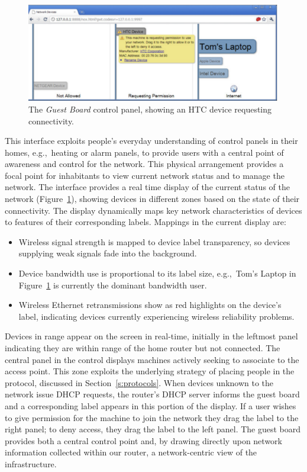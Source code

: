 \begin{figure} 
  \centering 
  \includegraphics[width=0.9\columnwidth]{homework_guest_board}
  \caption[The \emph{Guest Board} control panel]{\label{f:guest-board}The \emph{Guest Board} control panel, showing an
    HTC device requesting connectivity.}
\end{figure}

This interface exploits people's everyday understanding of control panels in
their homes, e.g.,~heating or alarm panels, to provide users with a central
point of awareness and control for the network. This physical arrangement
provides a focal point for inhabitants to view current network status and to
manage the network.  The interface provides a real time display of the current
status of the network (Figure~\ref{f:guest-board}), showing devices in different
zones based on the state of their connectivity.  The display dynamically maps
key network characteristics of devices to features of their corresponding
labels.  Mappings in the current display are: 

\begin{itemize}
\item Wireless signal strength is mapped to device label transparency, so
      devices supplying weak signals fade into the background.
\item Device bandwidth use is proportional to its label size, e.g.,~Tom's Laptop
      in Figure~\ref{f:guest-board} is currently the dominant bandwidth user. 
\item Wireless Ethernet retransmissions show as red highlights on the device's
  label, indicating devices currently experiencing wireless reliability problems. 
\end{itemize}

Devices in range appear on the screen in real-time, initially in the leftmost
panel indicating they are within range of the home router but not connected.
The central panel in the control displays machines actively seeking to associate
to the access point. This zone exploits the underlying strategy of placing
people in the protocol, discussed in Section~\ref{s:protocols}.  When devices
unknown to the network issue DHCP requests, the router's DHCP server informs the
guest board and a corresponding label appears in this portion of the display.
If a user wishes to give permission for the machine to join the network they
drag the label to the right panel; to deny access, they drag the label to the
left panel. The guest board provides both a central control point and, by
drawing directly upon network information collected within our router, a
network-centric view of the infrastructure. 

